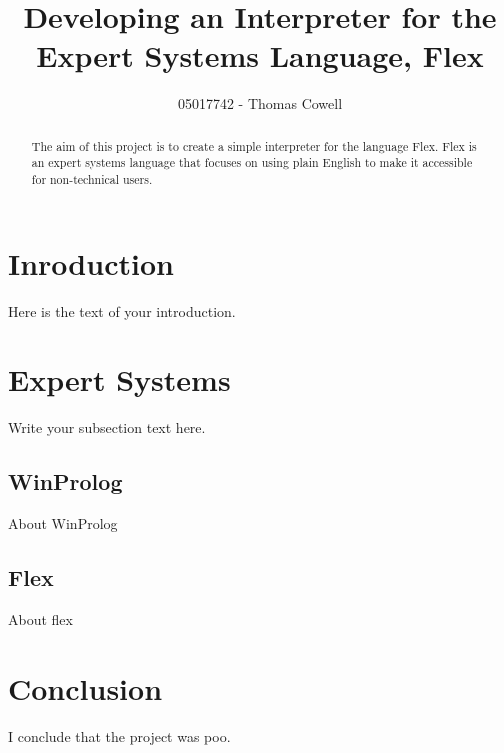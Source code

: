 \documentclass{article}
\begin{document}
\title{Developing an Interpreter for the Expert Systems Language, Flex}
\author{05017742 - Thomas Cowell}

\maketitle

\begin{abstract}
The aim of this project is to create a simple interpreter for the language Flex.  Flex is an expert systems language that focuses on using plain English to make it accessible for
non-technical users.
\end{abstract}

\section{Inroduction}\label{sec:introduction}
Here is the text of your introduction.

\section{Expert Systems}\label{sec:expert_systems}
Write your subsection text here.

\subsection{WinProlog}\label{subsec:winprolog}
About WinProlog

\subsection{Flex}\label{subsec:flex}
About flex


\section{Conclusion}
I conclude that the project was poo.
\end{document}
